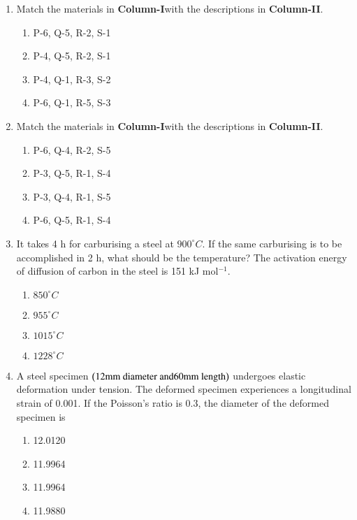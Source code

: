 \documentclass[journal]{IEEEtran}
\begin{document}
\begin{enumerate}
\item Match the materials in \textbf{Column-I}with the descriptions in \textbf{Column-II}.
\begin{table}[h]
    \centering
    
    \label{tab:my_label}
\end{table}
\begin{multicols}{2}
\begin{enumerate}
    \item P-6, Q-5, R-2, S-1  
    \item P-4, Q-5, R-2, S-1
    \item P-4, Q-1, R-3, S-2 
    \item P-6, Q-1, R-5, S-3
\end{enumerate}
\end{multicols}

\item Match the materials in \textbf{Column-I}with the descriptions in \textbf{Column-II}.
\begin{table}[h]
    \centering
    
    \label{tab:my_label}
\end{table}
\begin{multicols}{2}
\begin{enumerate}
    \item P-6, Q-4, R-2, S-5
    \item P-3, Q-5, R-1, S-4
    \item P-3, Q-4, R-1, S-5
    \item P-6, Q-5, R-1, S-4
\end{enumerate}
\end{multicols}

\item It takes 4 h for carburising a steel at $900^{\circ}C $. If the same carburising is to be accomplished in 2 h, what should be the temperature? The activation energy of diffusion of carbon in the steel is 151 kJ mol$^{-1}$.
\begin{multicols}{4}
\begin{enumerate}
    \item $850^{\circ}C$
    \item $955^{\circ}C$
    \item $1015^{\circ}C$
    \item $1228^{\circ}C$
\end{enumerate}
\end{multicols}

\item A steel specimen $\left(12 \text{mm diameter and} 60 \text{mm length}\right)$ undergoes elastic deformation under tension. The deformed specimen experiences a longitudinal strain of 0.001. If the Poisson's ratio is 0.3, the diameter of the deformed specimen  is 
\begin{multicols}{4}
\begin{enumerate}
    \item 12.0120
    \item 11.9964
    \item 11.9964
    \item 11.9880
\end{enumerate}
\end{multicols}


\end{enumerate}
\end{document}
